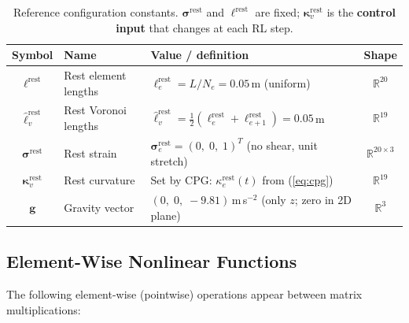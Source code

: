 \documentclass[11pt]{article}
\newcommand{\vect}[1]{\mathbf{#1}}
\newcommand{\Real}{\mathbb{R}}
\begin{document}
\begin{table}[H]
  \centering
  \renewcommand{\arraystretch}{1.3}
  \begin{tabular}{cllc}
    \toprule
    Symbol & Name & Value / definition & Shape \\
    \midrule
    $\bm{\ell}^{\text{rest}}$ & Rest element lengths & $\ell_e^{\text{rest}} = L / N_e = 0.05$\,m (uniform) & $\Real^{20}$ \\
    $\hat{\bm{\ell}}_v^{\text{rest}}$ & Rest Voronoi lengths & $\hat{\ell}_v^{\text{rest}} = \tfrac{1}{2}(\ell_e^{\text{rest}} + \ell_{e+1}^{\text{rest}}) = 0.05$\,m & $\Real^{19}$ \\
    $\bm{\sigma}^{\text{rest}}$ & Rest strain & $\bm{\sigma}_e^{\text{rest}} = (0,\; 0,\; 1)^T$ (no shear, unit stretch) & $\Real^{20 \times 3}$ \\
    $\bm{\kappa}_v^{\text{rest}}$ & Rest curvature & Set by CPG: $\kappa_e^{\text{rest}}(t)$ from (\ref{eq:cpg}) & $\Real^{19}$ \\
    $\vect{g}$ & Gravity vector & $(0,\; 0,\; -9.81)$\,m\,s$^{-2}$ (only $z$; zero in 2D plane) & $\Real^{3}$ \\
    \bottomrule
  \end{tabular}
  \caption{Reference configuration constants.  $\bm{\sigma}^{\text{rest}}$ and $\bm{\ell}^{\text{rest}}$ are fixed; $\bm{\kappa}_v^{\text{rest}}$ is the \textbf{control input} that changes at each RL step.}
  \label{tab:rest-constants}
\end{table}

\subsection{Element-Wise Nonlinear Functions}
\label{sec:nonlinear-functions}

The following element-wise (pointwise) operations appear between matrix multiplications:
\end{document}
